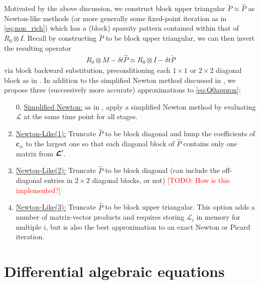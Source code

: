 \documentclass[review]{siamart}
\makeatletter
\newcommand{\todo}[1]{\textcolor{red}{[TODO\@: #1]}}
\makeatother
\begin{document}
Motivated by the above discussion, we construct {block upper triangular}
$\widetilde{P} \approx \widehat{P}$ as Newton-like methods (or more
generally some fixed-point iteration as in \eqref{eq:non_rich}) which has
a (block) sparsity pattern contained within that of $R_0 \otimes I$. Recall
by constructing $\widetilde{P}$ to be block upper triangular, we can then
invert the resulting operator
%
\begin{align}
R_0 \otimes M - \delta t \widehat{P} \approx R_0 \otimes I -  \delta t \widetilde{P}
\end{align}
%
via block backward substitution, preconditioning each $1\times 1$
or $2\times 2$ diagonal block as in .
In addition to the simplified Newton
method discussed in , we propose three (successively
more accurate) approximations to \eqref{eq:Q0approx}:
\vspace{1ex}
%
\begin{enumerate}
\setlength\itemsep{0.5em}
\item[0.] \underline{Simplified Newton:} as in , apply a
simplified Newton method by evaluating $\mathcal{L}$ at the same time point for
all stages.

\item \underline{Newton-Like(1):} Truncate $\widehat{P}$ to be block diagonal and
lump the coefficients of $\bm{c}_{ii}$ to the largest one so that each diagonal
block of $\widehat{P}$ contains only one matrix from $\bm{{\cal L}}'$.

\item \underline{Newton-Like(2):} Truncate $\widehat{P}$ to be block diagonal
(can include the off-diagonal entries in $2 \times 2$ diagonal blocks, or not)
\todo{How is this implemented?}

\item \underline{Newton-Like(3):} Truncate $\widehat{P}$ to be block upper triangular.
This option adds a number of matrix-vector products and requires storing $\mathcal{L}_i$ 
in memory for multiple $i$, but is also the best approximation to an exact Newton or
Picard iteration.

\end{enumerate}


\section{Differential algebraic equations}\label{sec:dae}
\end{document}

